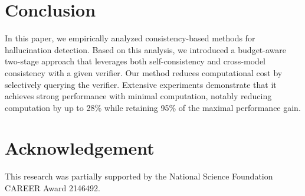 \section{Conclusion}

In this paper, we empirically analyzed consistency-based methods for hallucination detection. Based on this analysis, we introduced a budget-aware two-stage approach that leverages both self-consistency and cross-model consistency with a given verifier. Our method reduces computational cost by selectively querying the verifier. Extensive experiments demonstrate that it achieves strong performance with minimal computation, notably reducing computation by up to 28\% while retaining 95\% of the maximal performance gain.



\section*{Acknowledgement}
This research was partially supported by the National Science Foundation CAREER Award 2146492.

